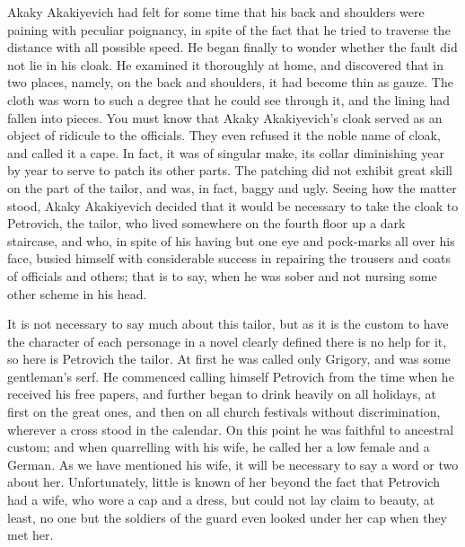 Akaky Akakiyevich had felt for some time that his back and shoulders
were paining with peculiar poignancy, in spite of the fact that he
tried to traverse the distance with all possible speed. He began
finally to wonder whether the fault did not lie in his cloak. He
examined it thoroughly at home, and discovered that in two places,
namely, on the back and shoulders, it had become thin as gauze. The
cloth was worn to such a degree that he could see through it, and the
lining had fallen into pieces. You must know that Akaky Akakiyevich's
cloak served as an object of ridicule to the officials. They even
refused it the noble name of cloak, and called it a cape. In fact, it
was of singular make, its collar diminishing year by year to serve to
patch its other parts. The patching did not exhibit great skill on the
part of the tailor, and was, in fact, baggy and ugly. Seeing how the
matter stood, Akaky Akakiyevich decided that it would be necessary to
take the cloak to Petrovich, the tailor, who lived somewhere on the
fourth floor up a dark staircase, and who, in spite of his having but
one eye and pock-marks all over his face, busied himself with
considerable success in repairing the trousers and coats of officials
and others; that is to say, when he was sober and not nursing some
other scheme in his head.

It is not necessary to say much about this tailor, but as it is the
custom to have the character of each personage in a novel clearly
defined there is no help for it, so here is Petrovich the tailor. At
first he was called only Grigory, and was some gentleman's serf. He
commenced calling himself Petrovich from the time when he received his
free papers, and further began to drink heavily on all holidays, at
first on the great ones, and then on all church festivals without
discrimination, wherever a cross stood in the calendar. On this point
he was faithful to ancestral custom; and when quarrelling with his
wife, he called her a low female and a German. As we have mentioned
his wife, it will be necessary to say a word or two about her.
Unfortunately, little is known of her beyond the fact that Petrovich
had a wife, who wore a cap and a dress, but could not lay claim to
beauty, at least, no one but the soldiers of the guard even looked
under her cap when they met her.

